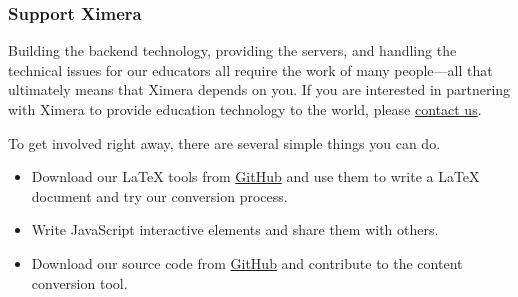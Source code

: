 \documentclass{ximera}
\begin{document}
\subsubsection{Support Ximera}\label{support-ximera}

Building the backend technology, providing the servers, and handling the
technical issues for our educators all require the work of many
people---all that ultimately means that Ximera depends on you. If you
are interested in partnering with Ximera to provide education technology
to the world, please \href{/about/contact}{contact us}.

To get involved right away, there are several simple things you can do.

\begin{itemize}
\item
  Download our LaTeX tools from
  \href{https://github.com/bartsnapp/ximeraLatex}{GitHub} and use them
  to write a LaTeX document and try our conversion process.
\item
  Write JavaScript interactive elements and share them with others.
\item
  Download our source code from
  \href{https://github.com/kisonecat/ximera}{GitHub} and contribute to
  the content conversion tool.
\end{itemize}
\end{document}
